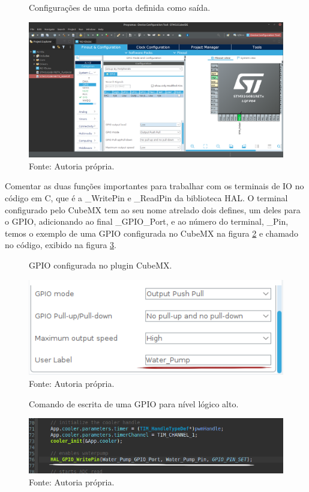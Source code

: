 \documentclass[12pt,a4paper]{report}
\begin{document}
\begin{figure}[H]
    \centering
    \caption{Configurações de uma porta definida como saída.}
    \includegraphics[scale=0.2]{fig/cubeIDE_project_io_2.png}
    \caption*{Fonte: Autoria própria.}
    \label{fig:cubeIDE_project_io_2}
\end{figure}

Comentar as duas funções importantes para trabalhar com os terminais de IO no código em C, que é a \_WritePin e \_ReadPin da biblioteca HAL. O terminal configurado pelo CubeMX tem ao seu nome atrelado dois defines, um deles para o GPIO, adicionando ao final \_GPIO\_Port, e ao número do terminal, \_Pin, temos o exemplo de uma GPIO configurada no CubeMX na figura \ref{fig:CubeMX_gpio} e chamado no código, exibido na figura \ref{fig:code_gpio_call}.

\begin{figure}[H]
    \centering
    \caption{GPIO configurada no plugin CubeMX.}
    \includegraphics[scale=0.8]{fig/CubeMX_gpio.png}
    \caption*{Fonte: Autoria própria.}
    \label{fig:CubeMX_gpio}
\end{figure}

\begin{figure}[H]
    \centering
    \caption{Comando de escrita de uma GPIO para nível lógico alto.}
    \includegraphics[scale=0.6]{fig/code_gpio_call.png}
    \caption*{Fonte: Autoria própria.}
    \label{fig:code_gpio_call}
\end{figure}
\end{document}
